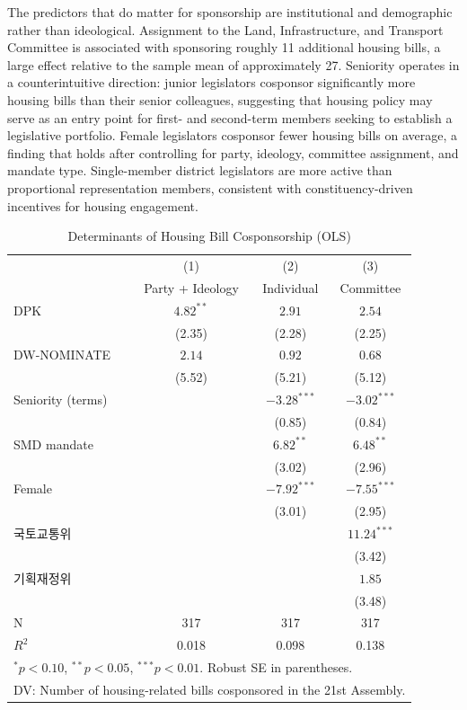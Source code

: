 \documentclass[11pt]{article}
\begin{document}
The predictors that do matter for sponsorship are institutional and demographic rather than ideological. Assignment to the Land, Infrastructure, and Transport Committee is associated with sponsoring roughly 11 additional housing bills, a large effect relative to the sample mean of approximately 27. Seniority operates in a counterintuitive direction: junior legislators cosponsor significantly more housing bills than their senior colleagues, suggesting that housing policy may serve as an entry point for first- and second-term members seeking to establish a legislative portfolio. Female legislators cosponsor fewer housing bills on average, a finding that holds after controlling for party, ideology, committee assignment, and mandate type. Single-member district legislators are more active than proportional representation members, consistent with constituency-driven incentives for housing engagement.

\begin{table}[H]
\centering
\caption{Determinants of Housing Bill Cosponsorship (OLS)}
\label{tab:sponsor}
\begin{tabular}{lccc}
\toprule
 & (1) & (2) & (3) \\
 & Party + Ideology & Individual & Committee \\
\midrule
DPK & $4.82^{**}$ & $2.91$ & $2.54$ \\
 & (2.35) & (2.28) & (2.25) \\[4pt]
DW-NOMINATE & $2.14$ & $0.92$ & $0.68$ \\
 & (5.52) & (5.21) & (5.12) \\[4pt]
Seniority (terms) &  & $-3.28^{***}$ & $-3.02^{***}$ \\
 &  & (0.85) & (0.84) \\[4pt]
SMD mandate &  & $6.82^{**}$ & $6.48^{**}$ \\
 &  & (3.02) & (2.96) \\[4pt]
Female &  & $-7.92^{***}$ & $-7.55^{***}$ \\
 &  & (3.01) & (2.95) \\[4pt]
국토교통위 &  &  & $11.24^{***}$ \\
 &  &  & (3.42) \\[4pt]
기획재정위 &  &  & $1.85$ \\
 &  &  & (3.48) \\
\midrule
N & 317 & 317 & 317 \\
$R^2$ & 0.018 & 0.098 & 0.138 \\
\bottomrule
\multicolumn{4}{l}{\footnotesize $^{*}p<0.10$, $^{**}p<0.05$, $^{***}p<0.01$. Robust SE in parentheses.} \\
\multicolumn{4}{l}{\footnotesize DV: Number of housing-related bills cosponsored in the 21st Assembly.}
\end{tabular}
\end{table}
\end{document}
